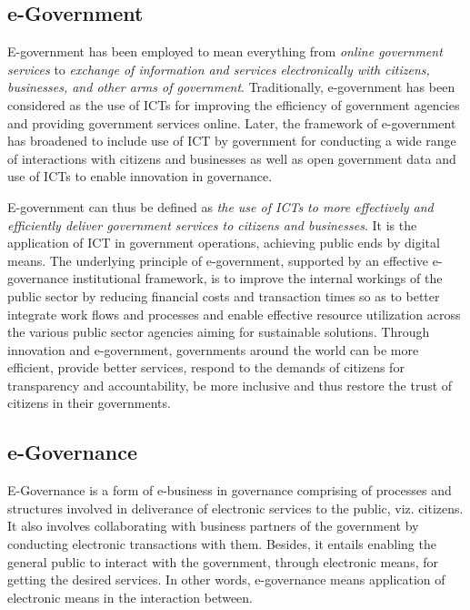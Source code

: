 \subsection{e-Government}
E-government has been employed to mean everything from \textit{online government services} to \textit{exchange of information and services electronically with citizens, businesses, and other arms of government}. Traditionally, e-government has been considered as the use of ICTs for improving the efficiency of government agencies and providing government services online. Later, the framework of e-government has broadened to include use of ICT by government for conducting a wide range of interactions with citizens and businesses as well as open government data and use of ICTs to enable innovation in governance.\par

E-government can thus be defined as \textit{the use of ICTs to more effectively and efficiently deliver government services to citizens and businesses}. It is the application of ICT in government operations, achieving public ends by digital means. The underlying principle of e-government, supported by an effective e-governance institutional framework, is to improve the internal workings of the public sector by reducing financial costs and transaction times so as to better integrate work flows and processes and enable effective resource utilization across the various public sector agencies aiming for sustainable solutions. Through innovation and e-government, governments around the world can be more efficient, provide better services, respond to the demands of citizens for transparency and accountability, be more inclusive and thus restore the trust of citizens in their governments.


\subsection{e-Governance}
E-Governance is a form of e-business in governance comprising of processes and structures
involved in deliverance of electronic services to the public, viz. citizens. It also involves
collaborating with business partners of the government by conducting electronic transactions
with them. Besides, it entails enabling the general public to interact with the government,
through electronic means, for getting the desired services. In other words, e-governance
means application of electronic means in the interaction between.

